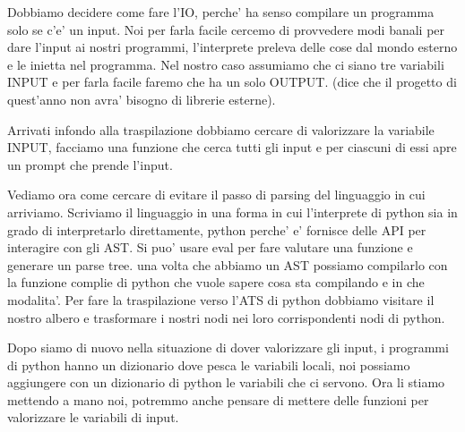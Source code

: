 Dobbiamo decidere come fare l'IO, perche' ha senso compilare un programma solo se c'e' un input. Noi per farla facile cercemo di provvedere modi banali per dare l'input ai nostri programmi, l'interprete preleva delle cose dal mondo esterno e le inietta nel programma. Nel nostro caso assumiamo che ci siano tre variabili INPUT e per farla facile faremo che ha un solo OUTPUT. (dice che il progetto di quest'anno non avra' bisogno di librerie esterne).


Arrivati infondo alla traspilazione dobbiamo cercare di valorizzare la variabile INPUT, facciamo una funzione che cerca tutti gli input e per ciascuni di essi apre un prompt che prende l'input.

Vediamo ora come cercare di evitare il passo di parsing del linguaggio in cui arriviamo. Scriviamo il linguaggio in una forma in cui l'interprete di python sia in grado di interpretarlo direttamente, python perche' e' fornisce delle API per interagire con gli AST.
Si puo' usare eval per fare valutare una funzione e generare un parse tree. una volta che abbiamo un AST possiamo compilarlo con la funzione complie di python che vuole sapere cosa sta compilando e in che modalita'.
Per fare la traspilazione verso l'ATS di python dobbiamo visitare il nostro albero e trasformare i nostri nodi nei loro corrispondenti nodi di python.

Dopo siamo di nuovo nella situazione di dover valorizzare gli input, i programmi di python hanno un dizionario dove pesca le variabili locali, noi possiamo aggiungere con un dizionario di python le variabili che ci servono. Ora li stiamo mettendo a mano noi, potremmo anche pensare di mettere delle funzioni per valorizzare le variabili di input.